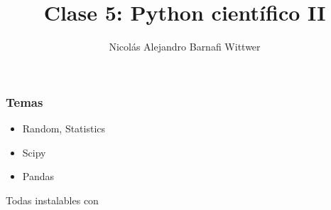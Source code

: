 \documentclass[14pt,aspectratio=169,xcolor=dvipsnames]{beamer}
\title[short title]{Clase 5: Python científico II}
\subtitle{}
\author[NA Barnafi] {Nicolás Alejandro Barnafi Wittwer}
\institute[UC|CMM] 
{
    Pontificia Universidad Católica de Chile \\
    Centro de Modelamiento Matemático
}
\date{}
\begin{document}
\begin{frame}
    \maketitle
\end{frame}
\begin{frame}\frametitle{Temas}
    \begin{itemize}
        \item Random, Statistics
        \item Scipy
        \item Pandas
    \end{itemize}

    \vspace{1cm}
    Todas instalables con 
\end{frame}
\end{document}
